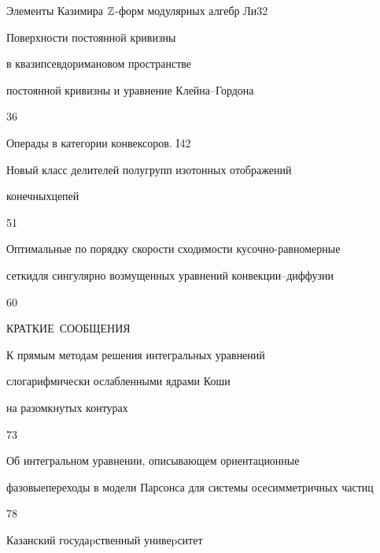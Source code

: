 {Элементы Казимира $\Bbb Z$-форм модулярных алгебр Ли}{32}




{Поверхности постоянной кривизны


в квазипсевдоримановом пространстве\newline


постоянной кривизны и уравнение Клейна--Гордона}{36}




{Операды в категории конвексоров. I}{42}




{Новый класс делителей полугрупп изотонных отображений


конечных\newline цепей}{51}




{Оптимальные по порядку скорости сходимости кусочно-равномерные


сетки\newline для сингулярно возмущенных уравнений конвекции--диффузии}{60}








\bigskip


\par


\centerline{\Large КРАТКИЕ~СООБЩЕНИЯ}


\bigskip







{К прямым методам решения интегральных уравнений 


с\newline логарифмически ослабленными ядрами Коши 


на разомкнутых контурах}{73}




{Об интегральном уравнении, описывающем ориентационные


фазовые\newline переходы в модели Парсонса для системы осесимметричных частиц}{78}











\vfill


\noindent\raisebox{2pt}{\copyright} Казанский госудаpственный унивеpситет





